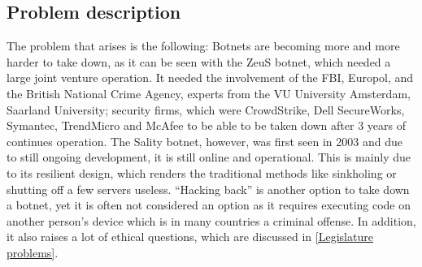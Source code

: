 \documentclass[10pt, a4paper, twocolumn]{article} %
\begin{document}
\subsection{Problem description}
The problem that arises is the following: Botnets are becoming more and more harder to take down, as it can be seen with the ZeuS botnet, which needed a large joint venture operation. It needed the involvement of the FBI, Europol, and the British National Crime Agency, experts from the VU University Amsterdam, Saarland University; security firms, which were CrowdStrike, Dell SecureWorks, Symantec, TrendMicro and McAfee to be able to be taken down after 3 years of continues operation\cite{briankrebs}. The Sality botnet, however, was first seen in 2003 and due to still ongoing development, it is still online and operational. This is mainly due to its resilient design, which renders the traditional methods like sinkholing or shutting off a few servers useless. ``Hacking back'' is another option to take down a botnet, yet it is often not considered an option as it requires executing code on another person's device which is in many countries a criminal offense. In addition, it also raises a lot of ethical questions, which are discussed in \autoref{Legislature problems}.
\end{document}
